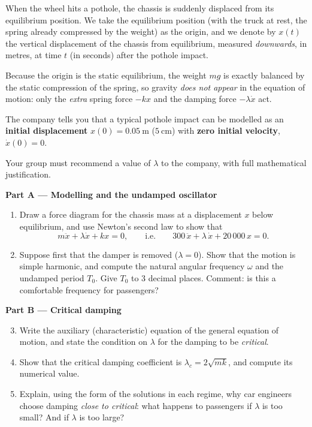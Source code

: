 \documentclass[11pt]{article}
\newcommand{\cle}[1]{{\popxbold\color{popdark}#1}}
\newcounter{popsec}
\newcounter{popsub}
\newcommand{\courssub}[1]{%
  \stepcounter{popsub}%
  \par\vspace{9pt}\noindent{\popxbold\fontsize{11.5}{13}\selectfont\color{popink}{\color{poporange}\thepopsec.\thepopsub}\hspace{6pt}#1}\par\nopagebreak\vspace{4pt}
}
\begin{document}
When the wheel hits a pothole, the chassis is suddenly displaced from its equilibrium position. We take the \cle{equilibrium position} (with the truck at rest, the spring already compressed by the weight) as the origin, and we denote by $x(t)$ the vertical displacement of the chassis from equilibrium, measured \emph{downwards}, in metres, at time $t$ (in seconds) after the pothole impact.

Because the origin is the static equilibrium, the weight $mg$ is exactly balanced by the static compression of the spring, so gravity \emph{does not appear} in the equation of motion: only the \emph{extra} spring force $-kx$ and the damping force $-\lambda\dot{x}$ act.

The company tells you that a typical pothole impact can be modelled as an \textbf{initial displacement} $x(0)=0.05\ \mathrm{m}$ ($5\ \mathrm{cm}$) with \textbf{zero initial velocity}, $\dot{x}(0)=0$.

Your group must recommend a value of $\lambda$ to the company, with full mathematical justification.

\courssub{Tasks}

\textbf{Part A --- Modelling and the undamped oscillator}

\begin{enumerate}
\item Draw a force diagram for the chassis mass at a displacement $x$ below equilibrium, and use Newton's second law to show that
\[ m\ddot{x}+\lambda\dot{x}+kx=0, \qquad\text{i.e.}\qquad 300\,\ddot{x}+\lambda\,\dot{x}+20\,000\,x=0. \]
\item Suppose first that the damper is removed ($\lambda=0$). Show that the motion is simple harmonic, and compute the natural angular frequency $\omega$ and the undamped period $T_0$. Give $T_0$ to 3 decimal places. Comment: is this a comfortable frequency for passengers?
\end{enumerate}

\textbf{Part B --- Critical damping}

\begin{enumerate}
\setcounter{enumi}{2}
\item Write the auxiliary (characteristic) equation of the general equation of motion, and state the condition on $\lambda$ for the damping to be \emph{critical}.
\item Show that the critical damping coefficient is $\lambda_c = 2\sqrt{mk}$, and compute its numerical value.
\item Explain, using the form of the solutions in each regime, why car engineers choose damping \emph{close to critical}: what happens to passengers if $\lambda$ is too small? And if $\lambda$ is too large?
\end{enumerate}
\end{document}
